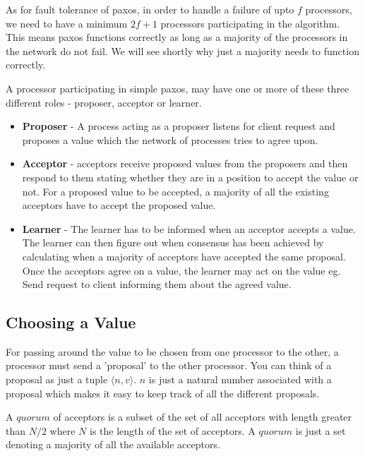 As for fault tolerance of paxos, in order to handle a failure of upto $f$ processors,
we need to have a minimum $2f+1$ processors participating in the algorithm. This
means paxos functions correctly as long as a majority of the processors in the
network do not fail. We will see shortly why just a majority needs to function
correctly.

A processor participating in simple paxos, may have one or more of these three
different roles - proposer, acceptor or learner.
\begin{itemize}
  \item \textbf{Proposer} - A process acting as a proposer listens for client
    request and proposes a value which the network of processes tries to agree upon.
  \item \textbf{Acceptor} - acceptors receive proposed values from the proposers
    and then respond to them stating whether they are in a position to accept the value or not.
    For a proposed value to be accepted, a majority of all the existing acceptors
    have to accept the proposed value.
  \item \textbf{Learner} - The learner has to be informed when an acceptor accepts a value.
    The learner can then figure out when consensus has been achieved by calculating
    when a majority of acceptors have accepted the same proposal.
    Once the acceptors agree on a value, the learner may act on the value
    eg. Send request to client informing them about the agreed value.
\end{itemize}


\vspace{-4mm}
\subsection{Choosing a Value}
For passing around the value to be chosen from one processor to the other,
a processor must send a 'proposal' to the other processor.
You can think of a proposal as just a tuple $\langle n, v \rangle$.
$n$ is just a natural number associated with a proposal which makes
it easy to keep track of all the different proposals.

A $quorum$ of acceptors is a subset of the set of all acceptors with length greater
than $N/2$ where $N$ is the length of the set of acceptors. A $quorum$ is just
a set denoting a majority of all the available acceptors.

